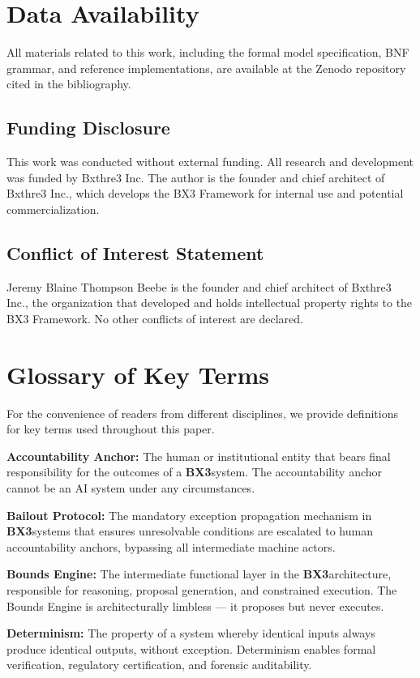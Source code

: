 \documentclass[12pt]{article}
\newcommand{\bxthree}{\textbf{BX3}}
\begin{document}
\section*{Data Availability}
All materials related to this work, including the formal model specification, BNF grammar, and reference implementations, are available at the Zenodo repository cited in the bibliography.

\subsection{Funding Disclosure}
This work was conducted without external funding. All research and development was funded by Bxthre3 Inc. The author is the founder and chief architect of Bxthre3 Inc., which develops the BX3 Framework for internal use and potential commercialization.

\subsection{Conflict of Interest Statement}
Jeremy Blaine Thompson Beebe is the founder and chief architect of Bxthre3 Inc., the organization that developed and holds intellectual property rights to the BX3 Framework. No other conflicts of interest are declared.

\section{Glossary of Key Terms}
\label{sec:glossary}

For the convenience of readers from different disciplines, we provide definitions for key terms used throughout this paper.

\textbf{Accountability Anchor:} The human or institutional entity that bears final responsibility for the outcomes of a \bxthree system. The accountability anchor cannot be an AI system under any circumstances.

\textbf{Bailout Protocol:} The mandatory exception propagation mechanism in \bxthree systems that ensures unresolvable conditions are escalated to human accountability anchors, bypassing all intermediate machine actors.

\textbf{Bounds Engine:} The intermediate functional layer in the \bxthree architecture, responsible for reasoning, proposal generation, and constrained execution. The Bounds Engine is architecturally limbless --- it proposes but never executes.

\textbf{Determinism:} The property of a system whereby identical inputs always produce identical outputs, without exception. Determinism enables formal verification, regulatory certification, and forensic auditability.
\end{document}
